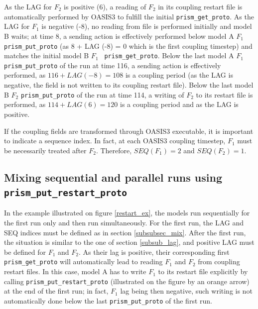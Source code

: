 As the LAG for $F_2$ is positive (6), a reading of $F_2$ in its
coupling restart file is automatically performed by OASIS3 to fulfill the initial
{\tt prism\_get\_proto}. As the LAG for $F_1$ is negative (-8), no
reading from file is performed initially and model B waits; at time 8,
a sending action is effectively performed below model A $F_1$ {\tt
prism\_put\_proto} (as 8 + LAG (-8) = 0 which is the first coupling
timestep) and matches the initial model B $F_1$ {\tt
prism\_get\_proto}. Below the last model A $F_1$ {\tt
prism\_put\_proto} of the run at time 116, a sending action is
effectively performed, as $116 + LAG(-8) = 108$ is a coupling period
(as the LAG is negative, the field is not written to its coupling
restart file). Below the last model B $F_2$ {\tt prism\_put\_proto} of
the run at time 114, a writing of $F_2$ to its restart file is
performed, as $114 + LAG(6) = 120$ is a coupling period and as the LAG
is positive.

If the coupling fields are transformed through OASIS3 executable, it
is important to indicate a sequence index. In fact, at each OASIS3
coupling timestep, $F_1$ must be necessarily treated after
$F_2$. Therefore, $SEQ(F_1) = 2$ and $SEQ(F_2) = 1$.

\subsection{Mixing sequential and parallel
    runs using {\tt prism\_put\_restart\_proto}}

In the example illustrated on figure \ref{restart_ex}, the models
run sequentially for the first run only and then run
simultaneously. For the first run, the LAG and SEQ indices must be
defined as in section \ref{subsubsec_mix}.  After the first run, the
situation is similar to the one of section \ref{subsub_lag}, and
positive LAG must be defined for $F_1$ and $F_2$. As their lag is
positive, their corresponding first {\tt prism\_get\_proto} will
automatically lead to reading $F_1$ and $F_2$ from coupling restart
files.  In this case, model A has to write $F_1$ to its restart file
explicitly by calling {\tt prism\_put\_restart\_proto} (illustrated
on the figure by an orange arrow) at the end of the first run; in
fact, $F_1$ lag being then negative, such writing is not automatically
done below the last {\tt prism\_put\_proto} of the first run.


